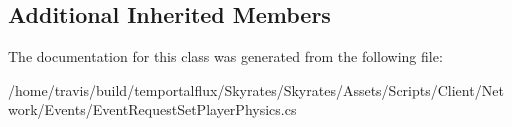 \subsection*{Additional Inherited Members}


The documentation for this class was generated from the following file\-:\begin{DoxyCompactItemize}
\item 
/home/travis/build/temportalflux/\-Skyrates/\-Skyrates/\-Assets/\-Scripts/\-Client/\-Network/\-Events/Event\-Request\-Set\-Player\-Physics.\-cs\end{DoxyCompactItemize}

